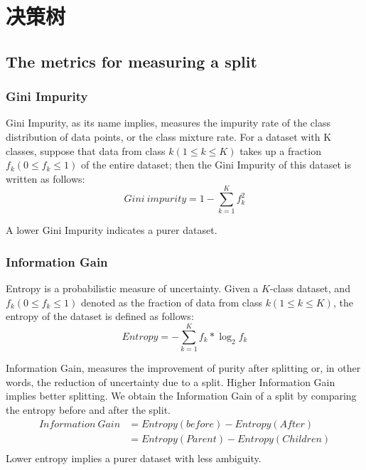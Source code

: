 \chapter{决策树\label{dt}}
\section{The metrics for measuring a split}
\subsection{Gini Impurity}
\begin{tcolorbox}
    \begin{definition}[Gini不纯度]
        Gini Impurity, as its name implies, measures the impurity rate of the class distribution of data points, or the class mixture rate. For a dataset with K classes, suppose that data from class $k(1 \leq k \leq K)$ takes up a fraction $f_k(0 \leq f_k \leq 1)$ of the entire dataset; then the Gini Impurity of this dataset is written as follows:
        $$Gini~impurity=1-\sum_{k=1}^Kf_k^2$$
    \end{definition}
\end{tcolorbox}
A lower Gini Impurity indicates a purer dataset.

\subsection{Information Gain}
\begin{definition}
    Entropy is a probabilistic measure of uncertainty. Given a $K$-class dataset, and $f_k (0 \leq f_k \leq 1)$ denoted as the fraction of data from class $k (1 \leq k \leq K)$, the entropy of the dataset is defined as follows:
    $$Entropy = -\sum_{k=1}^Kf_k*\log_2f_k$$
\end{definition}

\begin{tcolorbox}
    \begin{definition}
        Information Gain, measures the improvement of purity after splitting or, in other words, the reduction of uncertainty due to a split. Higher Information Gain implies better splitting. We obtain the Information Gain of a split by comparing the entropy before and after the split.
        \begin{equation*}
            \begin{aligned}
                Information~Gain & =Entropy(before)-Entropy(After)    \\
                                 & =Entropy(Parent)-Entropy(Children) \\
            \end{aligned}
        \end{equation*}
        Lower entropy implies a purer dataset with less ambiguity.
    \end{definition}
\end{tcolorbox}